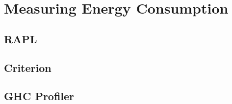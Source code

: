 \chapter{Measuring Energy Consumption}\label{chapter:tools}

\section{RAPL}
\lipsum[1-3]


\section{Criterion}
\lipsum[1-4]


\section{GHC Profiler}
\lipsum[1-4]
